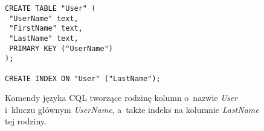 \begin{figure}[!ht]
\begin{verbatim}
CREATE TABLE "User" (
 "UserName" text,
 "FirstName" text,
 "LastName" text,
 PRIMARY KEY ("UserName")
);

CREATE INDEX ON "User" ("LastName");
\end{verbatim}

\caption{Komendy języka CQL tworzące rodzinę kolumn o~nazwie \emph{User} i~kluczu głównym \emph{UserName}, a~także indeks na kolumnie \emph{LastName} tej rodziny.}
\label{fig:cql:create}
\end{figure}
